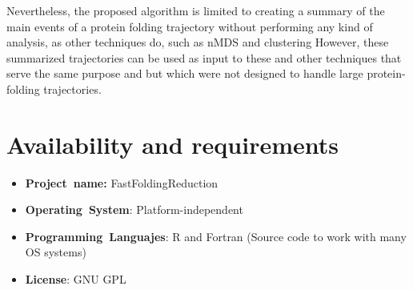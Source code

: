\documentclass[twocolumn]{bmcart}%
\begin{document}
Nevertheless, the proposed algorithm is limited to creating a summary of the main events of a protein folding trajectory without performing any kind of analysis, as other techniques do, such as nMDS and clustering However, these summarized trajectories can be used as input to these and other techniques that serve the same purpose and but which were not designed to handle large protein- folding trajectories.


\section*{Availability and requirements}
\begin{itemize}
\item \textbf{Project~name:} FastFoldingReduction
\item \textbf{Operating~System}: Platform-independent
\item \textbf{Programming~Languajes}: R and Fortran (Source code to work with many OS systems)
\item \textbf{License}: GNU GPL
\end{itemize}

\end{document}
